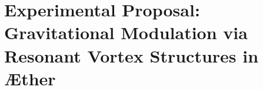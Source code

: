 \documentclass[preprint]{revtex4-2}
\newcommand{\paperdoi}{10.5281/zenodo.15566336}
\begin{document}
%
%
%
%
%
%
%
%
%
%
%
    \section{\textbf{Experimental Proposal: Gravitational Modulation via Resonant Vortex Structures in Æther}}
\end{document}
